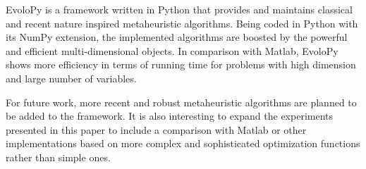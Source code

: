 \documentclass[a4paper,twoside]{article}
\begin{document}
EvoloPy is a framework written in Python that provides and maintains classical and recent nature inspired metaheuristic algorithms. Being coded in Python with its NumPy extension, the implemented algorithms are boosted by the powerful and efficient multi-dimensional objects. In comparison with Matlab, EvoloPy shows more efficiency in terms of running time for problems with  high dimension and large number of variables. 

For future work, more recent and robust metaheuristic algorithms are planned to be added to the framework. It is also interesting to expand the experiments presented in this paper to include a comparison with Matlab or other implementations based on more complex and sophisticated optimization functions rather than simple ones. 





{\small
}
\end{document}

